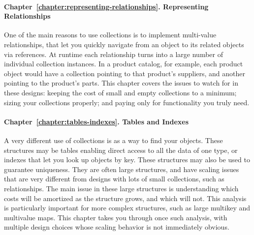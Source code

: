 \paragraph{Chapter~\ref{chapter:representing-relationships}. Representing
Relationships} One of the main reasons to use collections is to implement
multi-value relationships, that let you quickly navigate from an object
to its related objects via references. At runtime each relationship turns into a
large number of individual collection instances. In a product catalog, for example, 
each product object would have a collection
pointing to that product's suppliers, and another pointing to the product's
parts. This chapter covers the issues to watch for in these designs:
keeping the cost of small and empty collections to a minimum; sizing your collections properly; and paying only for functionality
you truly need.

\paragraph{Chapter~\ref{chapter:tables-indexes}. Tables and Indexes} A very
different use of collections is as a way to find your objects.  These
structures may be tables enabling direct access to all
the data of one type, or indexes that let you look up objects by key. These
structures may also be used to guarantee uniqueness. They are often large structures, and
have scaling issues that are very different from designs with lots of small
collections, such as relationships. The main issue in these large
structures is understanding which costs will be amortized as the structure
grows, and which will not. This analysis is particularly important for more complex structures,
such as large multikey and multivalue maps. This
chapter takes you through once such analysis, with multiple design
choices whose scaling behavior is not immediately obvious.

